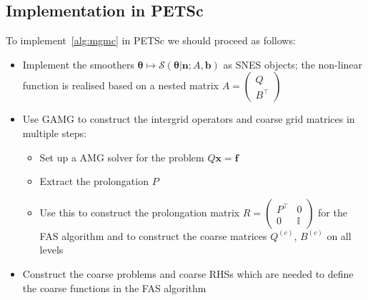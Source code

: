 \documentclass[11pt]{article}
\renewcommand{\vec}[1]{\boldsymbol{#1}}
\begin{document}
\subsection{Implementation in PETSc}
To implement~\cref{alg:mgmc} in PETSc we should proceed as follows:
\begin{itemize}
\item Implement the smoothers $\vec{\theta} \mapsto \mathcal{S}(\vec{\theta}|\vec{n};A,\vec{b})$ as SNES objects; the non-linear function is realised based on a nested matrix $A=\begin{pmatrix}Q\\B^\top\end{pmatrix}$
\item Use GAMG to construct the intergrid operators and coarse grid matrices in multiple steps:
\begin{itemize}
\item Set up a AMG solver for the problem $Q\vec{x}=\vec{f}$
\item Extract the prolongation $P$ 
\item Use this to construct the prolongation matrix $R = \begin{pmatrix}P^\top & 0\\0&\mathbb{I}\end{pmatrix}$ for the FAS algorithm and to construct the coarse matrices $Q^{(c)}$, $B^{(c)}$ on all levels
\end{itemize}
\item Construct the coarse problems and coarse RHSs which are needed to define the coarse functions in the FAS algorithm
\end{itemize} 
\end{document}
